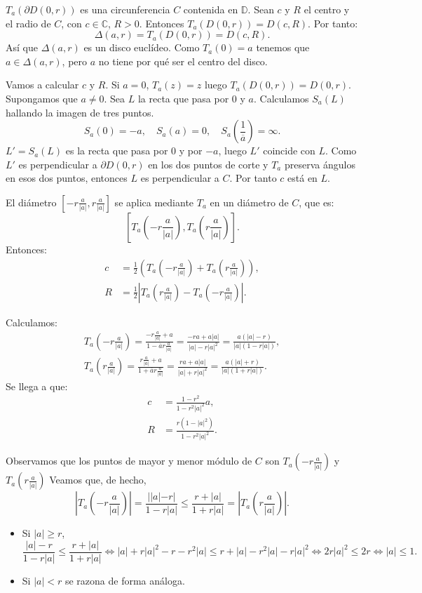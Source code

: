 $T_a(\partial D(0, r))$ es una circunferencia $C$ contenida en $\mathbb{D}$.
Sean $c$ y $R$ el centro y el radio de $C$, con $c \in \mathbb{C}$, $R > 0$.
Entonces $T_a(D(0, r)) = D(c, R)$.
Por tanto:
$$\Delta(a, r) = T_a(D(0, r)) = D(c, R).$$
Así que $\Delta(a, r)$ es un disco euclídeo.
Como $T_a(0) = a$ tenemos que $a \in \Delta(a, r)$, pero $a$ no tiene por qué ser el centro del disco.

Vamos a calcular $c$ y $R$.
Si $a = 0$, $T_a(z) = z$ luego $T_a(D(0, r)) = D(0, r)$.
Supongamos que $a \neq 0$.
Sea $L$ la recta que pasa por 0 y $a$.
Calculamos $S_a(L)$ hallando la imagen de tres puntos.
$$S_a(0) = -a, \quad S_a(a) = 0, \quad S_a\left(\frac{1}{\overline{a}}\right) = \infty.$$
$L' = S_a(L)$ es la recta que pasa por 0 y por $-a$, luego $L'$ coincide con $L$.
Como $L'$ es perpendicular a $\partial D(0, r)$ en los dos puntos de corte y $T_a$ preserva ángulos en esos dos puntos, entonces $L$ es perpendicular a $C$.
Por tanto $c$ está en $L$.

El diámetro $\left[-r\frac{a}{|a|}, r\frac{a}{|a|}\right]$ se aplica mediante $T_a$ en un diámetro de $C$, que es:
$$\left[T_a\left(-r\frac{a}{|a|}\right), T_a\left(r\frac{a}{|a|}\right)\right].$$
Entonces:
\begin{align*}
    c & = \frac{1}{2} \left(T_a\left(-r\frac{a}{|a|}\right) + T_a\left(r\frac{a}{|a|}\right)\right), \\
    R & = \frac{1}{2} \left|T_a\left(r\frac{a}{|a|}\right) - T_a\left(-r\frac{a}{|a|}\right)\right|.
\end{align*}

Calculamos:
\begin{align*}
    T_a\left(-r\frac{a}{|a|}\right) = \frac{-r\frac{a}{|a|}+a}{1-\overline{a}r\frac{a}{|a|}} = \frac{-ra+a|a|}{|a|-r|a|^2} = \frac{a(|a|-r)}{|a|(1-r|a|)}, \\
    T_a\left(r\frac{a}{|a|}\right) = \frac{r\frac{a}{|a|}+a}{1+\overline{a}r\frac{a}{|a|}} = \frac{ra+a|a|}{|a|+r|a|^2} = \frac{a(|a|+r)}{|a|(1+r|a|)}.
\end{align*}
Se llega a que:
\begin{align*}
    c & = \frac{1-r^2}{1-r^2|a|^2}a,     \\
    R & = \frac{r(1-|a|^2)}{1-r^2|a|^2}.
\end{align*}

Observamos que los puntos de mayor y menor módulo de $C$ son $T_a\left(-r\frac{a}{|a|}\right)$ y $T_a\left(r\frac{a}{|a|}\right)$
Veamos que, de hecho,
$$\left|T_a\left(-r\frac{a}{|a|}\right)\right| = \frac{||a|-r|}{1-r|a|} \leq \frac{r+|a|}{1+r|a|} = \left|T_a\left(r\frac{a}{|a|}\right)\right|.$$
\begin{itemize}
    \item Si $|a| \geq r$,
          $$\frac{|a|-r}{1-r|a|} \leq \frac{r+|a|}{1+r|a|} \Leftrightarrow |a| + r|a|^2 - r - r^2|a| \leq r + |a| - r^2|a| - r|a|^2 \Leftrightarrow 2r|a|^2 \leq 2r \Leftrightarrow |a| \leq 1.$$
    \item Si $|a| < r$ se razona de forma análoga.
\end{itemize}

